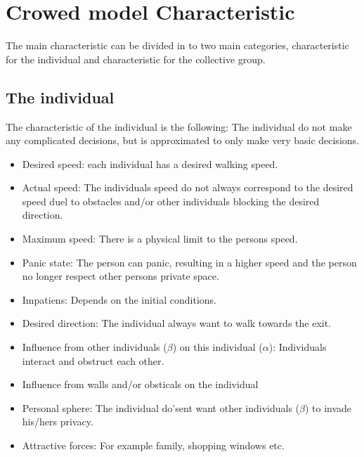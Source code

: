 \section{Crowed model Characteristic}
The main characteristic can be divided in to two main categories, characteristic for the individual and characteristic for the collective group.

\subsection{The individual}
The characteristic of the individual is the following: The individual do not make any complicated decisions, but is approximated to only make very basic decisions.
\begin{itemize}
\item Desired speed: each individual has a desired walking speed.\\

\item Actual speed: The individuals speed do not always correspond to the desired speed duel to obstacles and/or other individuals blocking the desired direction.\\
\item Maximum speed: There is a physical limit to the persons speed.\\
\item Panic state: The person can panic, resulting in a higher speed and the person no longer respect other persons private space.\\
\item Impatiens: Depends on the initial conditions.\\
\item Desired direction: The individual always want to walk towards the exit.\\
\item Influence from other individuals ($\beta$) on this individual ($\alpha$): Individuals interact and obstruct each other.\\
\item Influence from walls and/or obsticals on the individual\\
\item Personal sphere: The individual do'sent want other individuals ($\beta$) to invade his/hers privacy.\\
\item Attractive forces: For example family, shopping windows etc.\\

\end{itemize}


